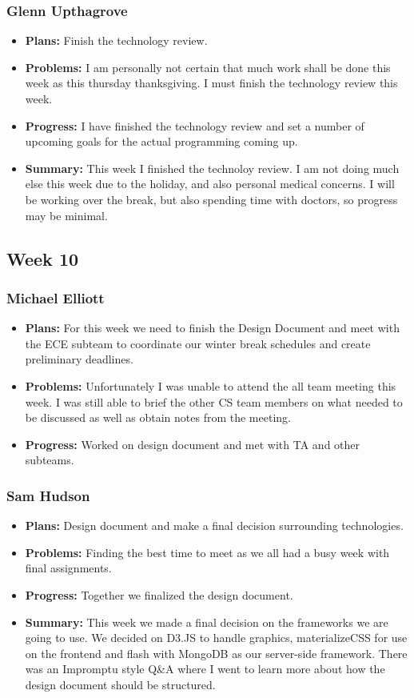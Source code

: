 \documentclass[onecolumn, draftclsnofoot,10pt, compsoc]{IEEEtran}
\begin{document}
\subsubsection{Glenn Upthagrove}
\begin {itemize}
 \item \textbf{Plans: }Finish the technology review. 
 \item \textbf{Problems: }I am personally not certain that much work shall be done this week as this thursday thanksgiving. I must finish the technology review this week.
 \item \textbf{Progress: }I have finished the technology review and set a number of upcoming goals for the actual programming coming up. 
 \item \textbf{Summary: }This week I finished the technoloy review. I am not doing much else this week due to the holiday, and also personal medical concerns. I will be working over the break, but also spending time with doctors, so progress may be minimal. 
\end {itemize}
\subsection {Week 10}
\subsubsection{Michael Elliott}
\begin {itemize}
\item \textbf{Plans: }
  For this week we need to finish the Design Document and meet with the ECE subteam to coordinate our winter break schedules and create preliminary deadlines.
\item \textbf{Problems: }
  Unfortunately I was unable to attend the all team meeting this week. I was still able to brief the other CS team members on what needed to be discussed as well as obtain notes from the meeting.
\item \textbf{Progress: }
  Worked on design document and met with TA and other subteams.
\end {itemize}
\subsubsection{Sam Hudson}
\begin {itemize}
\item \textbf{Plans: }Design document and make a final decision surrounding technologies.
\item \textbf{Problems: }Finding the best time to meet as we all had a busy week with final assignments.
\item \textbf{Progress: }Together we finalized the design document.
\item \textbf{Summary: }This week we made a final decision on the frameworks we are going to use. We decided on D3.JS to handle graphics, materializeCSS for use on the frontend and flash with MongoDB as our server-side framework. There was an Impromptu style Q\&A where I went to learn more about how the design document should be structured. 
\end {itemize}
\end{document}

